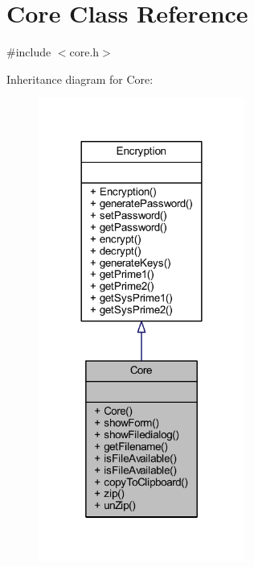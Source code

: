 \hypertarget{class_core}{}\section{Core Class Reference}
\label{class_core}


{\ttfamily \#include $<$core.\+h$>$}



Inheritance diagram for Core\+:\nopagebreak
\begin{figure}[H]
\begin{center}
\leavevmode
\includegraphics[width=192pt]{class_core__inherit__graph}
\end{center}
\end{figure}


